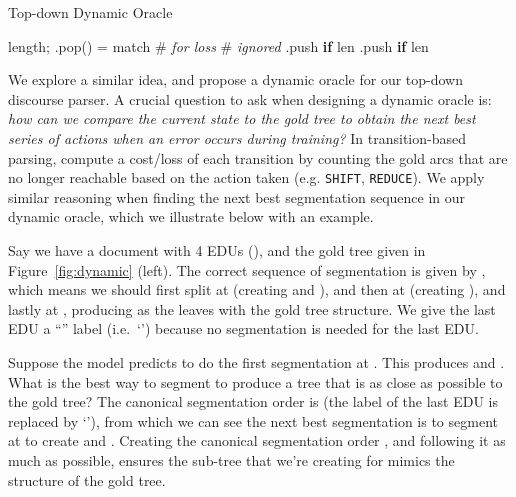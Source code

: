 \documentclass[11pt,a4paper]{article}
\newcommand{\figref}[2][]{Figure#1~\ref{fig:#2}}
\begin{document}
 \begin{algorithm}[t]
    \small
	\caption{Top-down Dynamic Oracle}
        \label{alg:oracle}
	\begin{algorithmic}[1]
		\State  length; 
			\State .pop()
			\State  = match
			\State 
			\State  \# \textit{for loss}
			\State  \# \textit{ignored}
				\State 
			\Else
				\State 
			\EndIf
			\State .push \textbf{if} len
			\State .push \textbf{if} len
		\EndWhile
		\EndFunction
	\end{algorithmic}
\end{algorithm}



We explore a similar idea, and propose a dynamic oracle for our top-down
discourse parser.
A crucial question to ask when designing a dynamic oracle is:
\textit{how can we compare the current state to the gold tree to obtain
the next best series of actions when an error occurs during training?}
In transition-based parsing, \citet{goldberg-nivre-2012-dynamic} compute
a cost/loss of each transition by counting the gold arcs that are no
longer reachable based on the action taken (e.g. \texttt{SHIFT},
\texttt{REDUCE}). We apply similar reasoning when finding the next
best segmentation sequence in our dynamic oracle, which we illustrate
below with an example.





Say we have a document with 4 EDUs (), and the gold tree given
in \figref{dynamic} (left). The correct sequence of segmentation is
given by , which means we should first split at 
(creating  and ), and then at  (creating
), and lastly at , producing
 as the leaves with the gold tree structure. We give
the last EDU  a ``'' label (i.e.\ `') because no
segmentation is needed for the last EDU.

Suppose the model predicts to do the first segmentation at . This
produces  and . What is the best way to segment 
to produce a tree that is as close as possible to the gold tree? The
canonical segmentation order  is  (the label of the
last EDU is replaced by `'), from which we can see the next best segmentation is
to segment at  to create  and . Creating the
canonical segmentation order , and following it as much as possible,
ensures the sub-tree that we're creating for  mimics the
structure of the gold tree.
\end{document}
